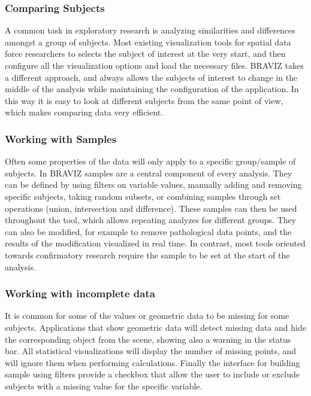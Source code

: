 \documentclass[twocolumn]{svjour3}
\begin{document}
\subsubsection{Comparing Subjects}

A common task in exploratory research is analyzing similarities and differences amongst a group of subjects. Most existing visualization tools for spatial data force researchers to selects the subject of interest at the very start, and then configure all the visualization options and load the necessary files. BRAVIZ takes a different approach, and always allows the subjects of interest to change in the middle of the analysis while maintaining the configuration of the application. In this way it is easy to look at different subjects from the same point of view, which makes comparing data very efficient.  

\subsubsection{Working with Samples}
\label{subsamples}
Often some properties of the data will only apply to a specific group/sample of subjects. In BRAVIZ samples are a central component of every analysis. They can be defined by using filters on variable values, manually adding and removing specific subjects, taking random subsets, or combining samples through set operations (union, intersection and difference). These samples can then be used throughout the tool, which allows repeating analyzes for different groups. They can also be modified, for example to remove pathological data points, and the results of the modification visualized in real time. In contrast, most tools oriented towards confirmatory research require the sample to be set at the start of the analysis.

\subsubsection{Working with incomplete data}

It is common for some of the values or geometric data to be missing for some subjects. Applications that show geometric data will detect missing data and hide the corresponding object from the scene, showing also a warning in the status bar. All statistical visualizations will display the number of missing points, and will ignore them when performing calculations. Finally the interface for building sample using filters provide a checkbox that allow the user to include or exclude subjects with a missing value for the specific variable.
\end{document}
